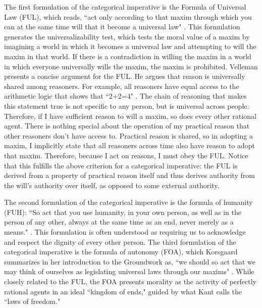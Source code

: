\begin{isabellebody}
\begin{isamarkuptext}
The first formulation of the categorical imperative is the
Formula of Universal Law (FUL), which reads, ``act only according to that maxim through which you can 
at the same time will that it become a universal law" \cite[34]{groundwork}. This formulation
generates the universalizability test, which tests the moral value of a maxim by 
imagining a world in which it becomes a universal law and attempting to will the maxim in that world.
If there is a contradiction in willing the maxim in a world in which everyone universally wills the maxim,
the maxim is prohibited. 
Velleman presents a concise argument for the FUL. He argues that reason is universally shared among reasoners. For 
example, all reasoners have equal access to the arithmetic logic that shows that ``2+2=4" \cite[29]{velleman}. The chain of 
reasoning that makes this statement true is not specific to any person, but is universal across people. 
Therefore, if I have sufficient reason to will a maxim, so does every other rational agent. There is 
nothing special about the operation of my practical reason that other reasoners don't have access to. 
Practical reason is shared, so in adopting a maxim, I implicitly state that all reasoners
across time also have reason to adopt that maxim. Therefore, because I act on reasons, I must obey the 
FUL. Notice that this fulfills the above criterion for a categorical imperative: the FUL is derived from 
a property of practical reason itself and thus derives authority from the will's authority over itself, 
as opposed to some external authority.

The second formulation of the categorical imperative is the formula of humanity (FUH): ``So act that you use humanity, 
in your own person, as well as in the person of any other, always at the same time as an end, never merely 
as a means." \cite[41]{groundwork}. This formulation is often understood as requiring us to 
acknowledge and respect the dignity of every other person. The third formulation of the categorical 
imperative is the formula of autonomy (FOA), which Korsgaard summarizes in her introduction to the Groundwork 
as, ``we should so act that we may think of ourselves as legislating universal laws through our 
maxims" \cite[28]{korsgaardintro}. While closely related to the FUL, the FOA presents morality as the activity of 
perfectly rational agents in an ideal ``kingdom of ends," guided by what Kant calls the ``laws of freedom."


\end{isamarkuptext}
\end{isabellebody}
